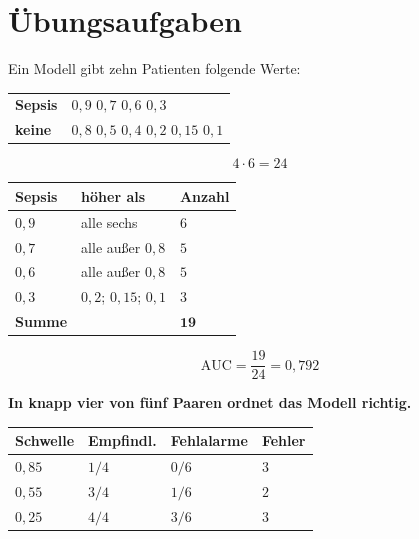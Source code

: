 \section{Übungsaufgaben}

\begin{aufgabe}
Ein Modell gibt zehn Patienten folgende Werte:
\begin{center}
{\small
\renewcommand{\arraystretch}{1.5}
\begin{tabular}{@{}P{2.4cm}P{5.6cm}@{}}
\toprule
\textbf{Sepsis} & $0{,}9$ \quad $0{,}7$ \quad $0{,}6$ \quad $0{,}3$\\
\textbf{keine} & $0{,}8$ \quad $0{,}5$ \quad $0{,}4$ \quad $0{,}2$ \quad $0{,}15$ \quad $0{,}1$\\
\bottomrule
\end{tabular}}
\end{center}

\loesung
{}
\[ 4\cdot6 = 24 \]

\begin{center}
{\small
\renewcommand{\arraystretch}{1.48}
\begin{tabular}{@{}P{1.8cm}P{4.2cm}P{1.6cm}@{}}
\toprule
\textbf{Sepsis} & \textbf{höher als} & \textbf{Anzahl}\\
\midrule
$0{,}9$ & alle sechs & $6$\\
$0{,}7$ & alle außer $0{,}8$ & $5$\\
$0{,}6$ & alle außer $0{,}8$ & $5$\\
$0{,}3$ & $0{,}2$; $0{,}15$; $0{,}1$ & $3$\\
\midrule
\textbf{Summe} & & $\mathbf{19}$\\
\bottomrule
\end{tabular}}
\end{center}

\[ \text{AUC} = \frac{19}{24} = 0{,}792 \]

\begin{center}
\begin{minipage}{0.9\textwidth}
\textbf{In knapp vier von fünf Paaren ordnet das Modell richtig.}
\end{minipage}
\end{center}

\begin{center}
{\small
\renewcommand{\arraystretch}{1.46}
\begin{tabular}{@{}P{1.8cm}P{2.2cm}P{2.2cm}P{1.6cm}@{}}
\toprule
\textbf{Schwelle} & \textbf{Empfindl.} & \textbf{Fehlalarme} & \textbf{Fehler}\\
\midrule
$0{,}85$ & $1/4$ & $0/6$ & $3$\\
$0{,}55$ & $3/4$ & $1/6$ & $2$\\
$0{,}25$ & $4/4$ & $3/6$ & $3$\\
\bottomrule
\end{tabular}}
\end{center}


\end{aufgabe}
